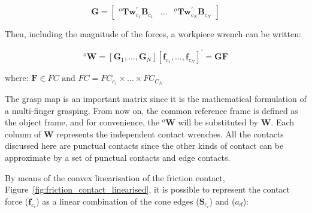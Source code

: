 \begin{equation}
\mathbf{G}=\left[\begin{array}{llll}
{{}^o \mathbf{T} \mathbf{w}_{c_1}^{\prime} \mathbf{B}_{c_1}} & {\dots} & {{}^{o} \mathbf{T} \mathbf{w}_{c_N}^{\prime} \mathbf{B}_{c_N}}
\end{array}\right]
\end{equation}

Then, including the magnitude of the forces, a workpiece wrench can be written:

\begin{equation}
^{o} \mathbf{W}=\left[\mathbf{G}_{1}, \ldots, \mathbf{G}_{N}\right]\left[\mathbf{f}_{c_1}, \ldots, \mathbf{f}_{c_N}\right]^{\prime}=\mathbf{G} \mathbf{F}
\end{equation}

\noindent
where: $\mathbf{F} \in F C \text { and } F C=F C_{c_1} \times \ldots \times F C_{C_N}$

The grasp map is an important matrix since it is the mathematical formulation of a multi-finger grasping. From now on, the common reference frame is defined as the object frame, and for convenience, the $^{o}\mathbf{W}$ will be substituted by $\mathbf{W}$. Each column of $\mathbf{W}$ represents the independent contact wrenches. All the contacts discussed here are punctual contacts since the other kinds of contact can be approximate by a set of punctual contacts and edge contacts.

By means of the convex linearisation of the friction contact, Figure~\ref{fig:friction_contact_linearised}, it is possible to represent the contact force ($\mathbf{f}_{c_i}$) as a linear combination of the cone edges ($\mathbf{S}_{c_i}$) and ($a_d$):

\begin{figure}[h!]
\end{figure}


